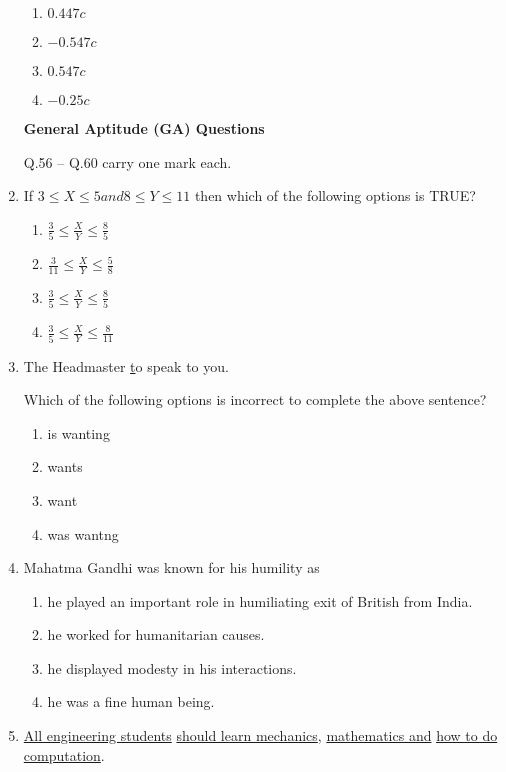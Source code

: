 \documentclass[journal]{IEEEtran}
\begin{document}
\begin{enumerate}
\begin{enumerate}
    \item $0.447c$
    \item $-0.547c$
    \item $0.547c$
    \item $-0.25c$\\
\end{enumerate}

\textbf{General Aptitude (GA) Questions}

Q.56 -- Q.60 carry one mark each.\\

\item If $3 \leq X \leq 5 and 8 \leq Y \leq 11$ then which of the following options is TRUE?

\begin{enumerate}
    \item $\frac{3}{5} \leq \frac{X}{Y} \leq \frac{8}{5}$
    \item $\frac{3}{11} \leq \frac{X}{Y} \leq \frac{5}{8}$
    \item $\frac{3}{5} \leq \frac{X}{Y} \leq \frac{8}{5}$
    \item $\frac{3}{5} \leq \frac{X}{Y} \leq \frac{8}{11}$\\
\end{enumerate}

\item The Headmaster \underline to speak to you.

Which of the following options is incorrect to complete the above sentence?

\begin{enumerate}
    \item is wanting
    \item wants
    \item want
    \item was wantng\\
\end{enumerate}

\item Mahatma Gandhi was known for his humility as

\begin{enumerate}
    \item he played an important role in humiliating exit of British from India.
    \item he worked for humanitarian causes.
    \item he displayed modesty in his interactions.
    \item he was a fine human being.\\
\end{enumerate}
\item \underline{All engineering students} \underline{should learn mechanics}, \underline{mathematics and} \underline{how to do computation}.


\end{enumerate}
\end{document}
